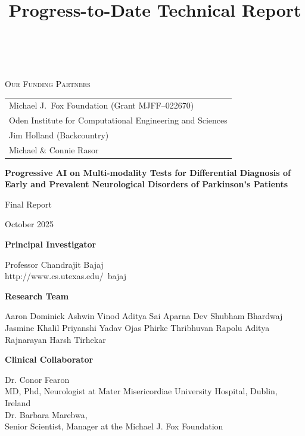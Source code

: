 \documentclass[11pt]{article}
\title{Progress-to-Date Technical Report}
\author{\ProjectPI\\ \Institution}
\date{\ReportDate}
\newcommand{\ProjectTitle}{Progressive AI on Multi-modality Tests for Differential Diagnosis of Early and Prevalent Neurological Disorders of Parkinson's Patients}
\newcommand{\ProjectPI}{Chandrajit Bajaj\\http://www.cs.utexas.edu/~bajaj}
\newcommand{\ReportDate}{October 2025}
\begin{document}
\begin{titlepage}
    \centering
    {\Large \textsc{Our Funding Partners}}\par\vspace{0.6em}
    \begin{tabular}{@{}l@{}}
        Michael J.\ Fox Foundation (Grant MJFF--022670) \\
        Oden Institute for Computational Engineering and Sciences \\
        Jim Holland (Backcountry) \\
        Michael \& Connie Rasor \\
    \end{tabular}\par
    \vspace{1.8em}

    {\huge \textbf{\ProjectTitle} \par}
    \vspace{0.5em}
    {\Large Final Report}\par
    \vspace{1em}
    {\large \ReportDate}\par
    \vspace{1em}

    {\Large \textbf{Principal Investigator}}\par
    {\large Professor \ProjectPI}\par
    \vspace{1em}

    {\Large \textbf{Research Team}}\par
    {\normalsize
    Aaron Dominick \quad Ashwin Vinod \quad Aditya Sai \quad Aparna Dev \quad Shubham Bhardwaj \\
    Jasmine Khalil \quad Priyanshi Yadav \quad Ojas Phirke \quad Thribhuvan Rapolu \quad Aditya Rajnarayan \quad Harsh Tirhekar}\par
    \vspace{1em}

    {\Large \textbf{Clinical Collaborator}}\par
    {\normalsize
     Dr. Conor Fearon\\MD, Phd, Neurologist at Mater Misericordiae University Hospital, Dublin, Ireland\\Dr. Barbara Marebwa, \\Senior Scientist, Manager at the Michael J. Fox Foundation}\par
    \vspace{1em}
    


\end{titlepage}
\end{document}
